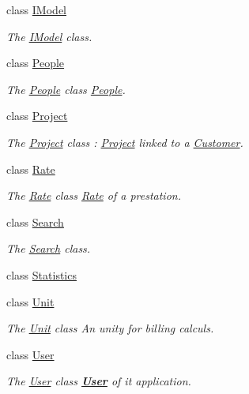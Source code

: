 \begin{DoxyCompactItemize}
class \hyperlink{classModels_1_1IModel}{I\-Model}
\begin{DoxyCompactList}\small\item\em The \hyperlink{classModels_1_1IModel}{I\-Model} class. \end{DoxyCompactList}\item 
class \hyperlink{classModels_1_1People}{People}
\begin{DoxyCompactList}\small\item\em The \hyperlink{classModels_1_1People}{People} class \hyperlink{classModels_1_1People}{People}. \end{DoxyCompactList}\item 
class \hyperlink{classModels_1_1Project}{Project}
\begin{DoxyCompactList}\small\item\em The \hyperlink{classModels_1_1Project}{Project} class \-: \hyperlink{classModels_1_1Project}{Project} linked to a \hyperlink{classModels_1_1Customer}{Customer}. \end{DoxyCompactList}\item 
class \hyperlink{classModels_1_1Rate}{Rate}
\begin{DoxyCompactList}\small\item\em The \hyperlink{classModels_1_1Rate}{Rate} class \hyperlink{classModels_1_1Rate}{Rate} of a prestation. \end{DoxyCompactList}\item 
class \hyperlink{classModels_1_1Search}{Search}
\begin{DoxyCompactList}\small\item\em The \hyperlink{classModels_1_1Search}{Search} class. \end{DoxyCompactList}\item 
class \hyperlink{classModels_1_1Statistics}{Statistics}
\item 
class \hyperlink{classModels_1_1Unit}{Unit}
\begin{DoxyCompactList}\small\item\em The \hyperlink{classModels_1_1Unit}{Unit} class An unity for billing calculs. \end{DoxyCompactList}\item 
class \hyperlink{classModels_1_1User}{User}
\begin{DoxyCompactList}\small\item\em The \hyperlink{classModels_1_1User}{User} class {\bfseries \hyperlink{classModels_1_1User}{User}} of it application. \end{DoxyCompactList}\end{DoxyCompactItemize}
